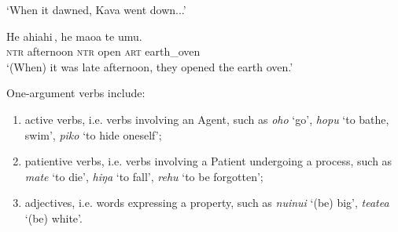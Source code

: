 \glt 
‘When it dawned, Kava went down...’ \textstyleExampleref{[R229.198]} 
\z

\ea\label{ex:3.83}
\gll {\ob}He ahiahi\,{\cb}, he ma{\ꞌ}oa te {\ꞌ}umu. \\
{\db}\textsc{ntr} afternoon \textsc{ntr} open \textsc{art} earth\_oven \\

\glt 
‘(When) it was late afternoon, they opened the earth oven.’ \textstyleExampleref{[Mtx-7-15.030]}
\z

One-argument verbs include:

\begin{enumerate}
\item 
active  verbs, i.e. verbs involving an Agent, such as \textit{oho} ‘go’, \textit{hopu} ‘to bathe, swim’, \textit{piko} ‘to hide oneself’;

\item 
patientive verbs, i.e. verbs involving a Patient undergoing a process, such as \textit{mate} ‘to die’, \textit{hiŋa} ‘to fall’, \textit{rehu} ‘to be forgotten’;

\item 
adjectives, i.e. words expressing a property, such as \textit{nuinui} ‘(be) big’, \textit{teatea} ‘(be) white’.

\end{enumerate}

